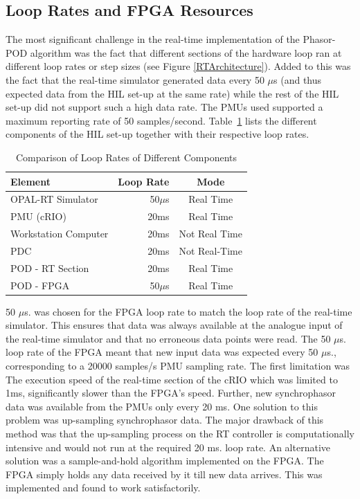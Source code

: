\documentclass[journal]{IEEEtran}
\begin{document}
\subsection{Loop Rates and FPGA Resources}\label{looprate}
The most significant challenge in the real-time implementation of the Phasor-POD algorithm was the fact that different sections of the hardware loop ran at different loop rates or step sizes (see Figure \ref{RTArchitecture}). Added to this was the fact that the real-time simulator generated data every 50 $\mu$s (and thus expected data from the HIL set-up at the same rate) while the rest of the HIL set-up did not support such a high data rate. The PMUs used supported a maximum reporting rate of 50 samples/second. Table~\ref{ex:LoopRates} lists the different components of the HIL set-up together with their respective loop rates.
\begin{table}[htpb]
\caption{Comparison of Loop Rates of Different Components}\label{ex:LoopRates}
\begin{center}
\begin{tabular}{|l|r|c|}
\hline \textbf{Element} & \textbf{Loop Rate} & \textbf{Mode} \\
\hline OPAL-RT Simulator & 50$\mu$s & Real Time \\ 
\hline PMU (cRIO) & 20ms & Real Time \\ 
\hline Workstation Computer& 20ms & Not Real Time \\ 
\hline PDC & 20ms & Not Real-Time \\ %
\hline POD - RT Section & 20ms & Real Time \\ 
\hline POD - FPGA & 50$\mu$s & Real Time \\ 
\hline 
\end{tabular}
\end{center}
\vspace{-1em}
\end{table} 


50 $\mu$s. was chosen for the FPGA loop rate to match the loop rate of the real-time simulator. This ensures that data was always available at the analogue input of the real-time simulator and that no erroneous data points were read. The 50 $\mu$s. loop rate of the FPGA meant that new input data was expected every 50 $\mu$s., corresponding to a 20000 samples/s PMU sampling rate. The first limitation was The execution speed of the real-time section of the cRIO which was limited to 1ms, significantly slower than the FPGA\rq{s} speed. Further, new synchrophasor data was available from the PMUs only every 20 ms. One solution to this problem was up-sampling synchrophasor data. The major drawback of this method was that the up-sampling process on the RT controller is computationally intensive and would not run at the required 20 ms. loop rate. An alternative solution was a sample-and-hold algorithm implemented on the FPGA. The FPGA simply holds any data received by it till new data arrives. This was implemented and found to work satisfactorily. %
\end{document}

